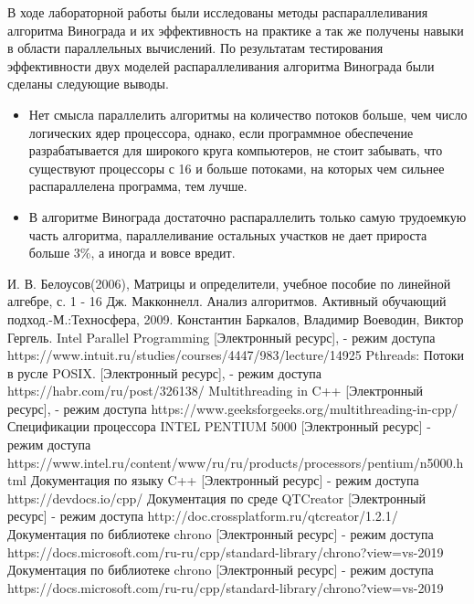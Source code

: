 \documentclass[a4paper, 14pt]{article}
\begin{document}
        В ходе лабораторной работы были исследованы методы распараллеливания алгоритма Винограда и их эффективность на практике а так же получены навыки в области параллельных вычислений. По результатам тестирования эффективности двух моделей распараллеливания алгоритма Винограда были сделаны следующие выводы.
        \begin{itemize}
        \item Нет смысла параллелить алгоритмы на количество потоков больше, чем число логических ядер процессора, однако, если программное обеспечение разрабатывается для широкого круга компьютеров, не стоит забывать, что существуют процессоры с 16 и больше потоками, на которых чем сильнее распараллелена программа, тем лучше.
        \item В алгоритме Винограда достаточно распараллелить только самую трудоемкую часть алгоритма, параллеливание остальных участков не дает прироста больше 3\%, а иногда и вовсе вредит.
        \end{itemize}
        


    \begin{center}
    	\newpage
        
        \begin{thebibliography}{}
	 И. В. Белоусов(2006), Матрицы и определители, учебное пособие по линейной алгебре, с. 1 - 16
      Дж. Макконнелл. Анализ алгоритмов. Активный обучающий подход.-М.:Техносфера, 2009.
	 Константин Баркалов, Владимир Воеводин, Виктор Гергель. Intel Parallel Programming [Электронный ресурс], - режим доступа https://www.intuit.ru/studies/courses/4447/983/lecture/14925	
     Pthreads: Потоки в русле POSIX. [Электронный ресурс], - режим доступа https://habr.com/ru/post/326138/
	 Multithreading in C++ [Электронный ресурс], - режим доступа https://www.geeksforgeeks.org/multithreading-in-cpp/
	 Спецификации процессора INTEL PENTIUM 5000 [Электронный ресурс] - режим доступа https://www.intel.ru/content/www/ru/ru/products/processors/pentium/n5000.html
	 Документация по языку C++ [Электронный ресурс] - режим доступа https://devdocs.io/cpp/
	 Документация по среде QTCreator [Электронный ресурс] - режим доступа http://doc.crossplatform.ru/qtcreator/1.2.1/	
	 Документация по библиотеке chrono [Электронный ресурс] - режим доступа https://docs.microsoft.com/ru-ru/cpp/standard-library/chrono?view=vs-2019
	 Документация по библиотеке chrono [Электронный ресурс] - режим доступа https://docs.microsoft.com/ru-ru/cpp/standard-library/chrono?view=vs-2019
	\end{thebibliography}
	
	
	
        
    \end{center}        
\end{document}
